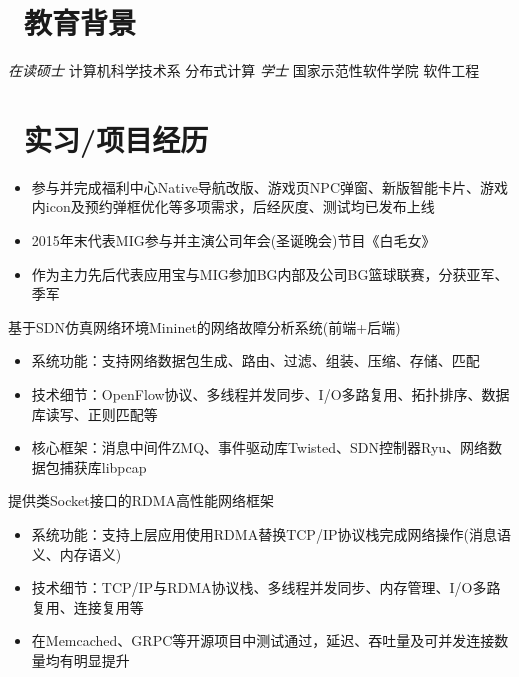 \documentclass{resume}
\begin{document}
{\section{\faGraduationCap\  教育背景}
\normalsize
\textit{在读硕士} \quad 计算机科学技术系 \quad 分布式计算
\normalsize
\textit{学士} \quad 国家示范性软件学院 \quad 软件工程

\section{\faUsers\ 实习/项目经历}

\normalsize
{}

\normalsize
{}
\begin{itemize}
  \item 参与并完成福利中心Native导航改版、游戏页NPC弹窗、新版智能卡片、游戏内icon及预约弹框优化等多项需求，后经灰度、测试均已发布上线
  \item 2015年末代表MIG参与并主演公司年会(圣诞晚会)节目《白毛女》
  \item 作为主力先后代表应用宝与MIG参加BG内部及公司BG篮球联赛，分获亚军、季军
\end{itemize}

\normalsize
{}
基于SDN仿真网络环境Mininet的网络故障分析系统(前端+后端)
\begin{itemize}
  \item 系统功能：支持网络数据包生成、路由、过滤、组装、压缩、存储、匹配
  \item 技术细节：OpenFlow协议、多线程并发同步、I/O多路复用、拓扑排序、数据库读写、正则匹配等
  \item 核心框架：消息中间件ZMQ、事件驱动库Twisted、SDN控制器Ryu、网络数据包捕获库libpcap
\end{itemize}

\normalsize
{}
提供类Socket接口的RDMA高性能网络框架
\begin{itemize}
  \item 系统功能：支持上层应用使用RDMA替换TCP/IP协议栈完成网络操作(消息语义、内存语义)
  \item 技术细节：TCP/IP与RDMA协议栈、多线程并发同步、内存管理、I/O多路复用、连接复用等
  \item 在Memcached、GRPC等开源项目中测试通过，延迟、吞吐量及可并发连接数量均有明显提升
\end{itemize}

}
\end{document}
